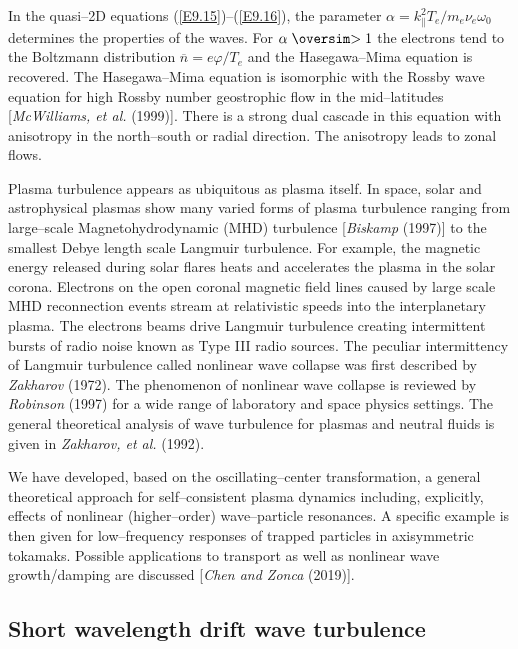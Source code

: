 \documentclass[a4paper,openany,12pt]{book}
\def\nms{\mathsurround=0pt}
\def\gtsim{\mathrel{\mathpalette\oversim>}} %
\def\oversim#1#2{\lower 2pt\vbox{\baselineskip 0pt \lineskip 1pt
    \ialign{$\nms#1\hfil##\hfil$\crcr#2\crcr\sim\crcr}}}
\begin{document}
In the quasi--2D equations (\ref{E9.15})--(\ref{E9.16}), the parameter $\alpha=k_\|^2 T_e/m_e\nu_e\omega_0$ determines the properties of the waves. For $\alpha\gtsim 1$ the electrons tend to the Boltzmann distribution $\overline n=e\varphi/T_e$ and the Hasegawa--Mima equation is recovered. The Hasegawa--Mima equation is isomorphic with the Rossby wave equation for high Rossby number geostrophic flow in the mid--latitudes [\emph{McWilliams, et al.} (1999)]. There is a strong dual cascade in this equation with anisotropy in the north--south or radial direction. The anisotropy leads to zonal flows.

Plasma turbulence appears as ubiquitous as plasma itself. In space, solar and astrophysical plasmas show many varied forms of plasma turbulence ranging from large--scale Magnetohydrodynamic (MHD) turbulence [\emph{Biskamp} (1997)] to the smallest Debye length scale Langmuir turbulence. For example, the magnetic energy released during solar flares heats and accelerates the plasma in the solar corona. Electrons on the open coronal magnetic field lines caused by large scale MHD reconnection events stream at relativistic speeds into the interplanetary plasma. The electrons beams drive Langmuir turbulence creating intermittent bursts of radio noise known as Type III radio sources. The peculiar intermittency of Langmuir turbulence called nonlinear wave collapse was first described by \emph{Zakharov} (1972). The phenomenon of nonlinear wave collapse is reviewed by \emph{Robinson} (1997) for a wide range of laboratory and space physics settings. The general theoretical analysis of wave turbulence for plasmas and neutral fluids is given in \emph{Zakharov, et al.} (1992).

We have developed, based on the oscillating--center transformation, a general theoretical approach for self--consistent plasma dynamics including, explicitly, effects of nonlinear (higher--order) wave--particle resonances. A specific example is then given for low--frequency responses of trapped particles in axisymmetric tokamaks. Possible applications to transport as well as nonlinear wave growth/damping are discussed [\emph{Chen and Zonca} (2019)].

\subsection{Short wavelength drift wave turbulence}
\end{document}
